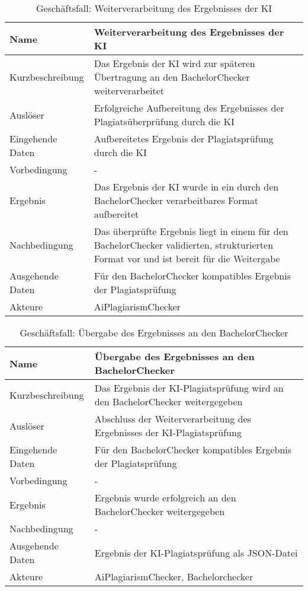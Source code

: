 \begin{table}
    \begin{tabularx}{\textwidth}{|l|X|}
        \hline
        \textbf{Name} & \textbf{Weiterverarbeitung des Ergebnisses der KI} \\
        \hline
        Kurzbeschreibung & Das Ergebnis der KI wird zur späteren Übertragung an den BachelorChecker weiterverarbeitet \\
        \hline
        Auslöser & Erfolgreiche Aufbereitung des Ergebnisses der Plagiatsüberprüfung durch die KI \\
        \hline
        Eingehende Daten & Aufbereitetes Ergebnis der Plagiatsprüfung durch die KI \\
        \hline
        Vorbedingung & - \\
        \hline
        Ergebnis & Das Ergebnis der KI wurde in ein durch den BachelorChecker verarbeitbares Format aufbereitet \\
        \hline
        Nachbedingung & Das überprüfte Ergebnis liegt in einem für den BachelorChecker validierten, strukturierten Format vor und ist bereit für die Weitergabe \\
        \hline
        Ausgehende Daten & Für den BachelorChecker kompatibles Ergebnis der Plagiatsprüfung \\
        \hline
        Akteure & AiPlagiarismChecker \\
        \hline
    \end{tabularx}
    \caption{Geschäftsfall: Weiterverarbeitung des Ergebnisses der KI}
    \label{tab:weiterverarbeitung-des-ergebnisses-der-ki}
\end{table}


\begin{table}
    \begin{tabularx}{\textwidth}{|l|X|}
        \hline
        \textbf{Name} & \textbf{Übergabe des Ergebnisses an den BachelorChecker} \\
        \hline
        Kurzbeschreibung & Das Ergebnis der KI-Plagiatsprüfung wird an den BachelorChecker weitergegeben \\
        \hline
        Auslöser & Abschluss der Weiterverarbeitung des Ergebnisses der KI-Plagiatsprüfung \\
        \hline
        Eingehende Daten & Für den BachelorChecker kompatibles Ergebnis der Plagiatsprüfung \\
        \hline
        Vorbedingung & - \\
        \hline
        Ergebnis & Ergebnis wurde erfolgreich an den BachelorChecker weitergegeben \\
        \hline
        Nachbedingung & - \\
        \hline
        Ausgehende Daten & Ergebnis der KI-Plagiatsprüfung als JSON-Datei \\
        \hline
        Akteure & AiPlagiarismChecker, Bachelorchecker \\
        \hline
    \end{tabularx}
    \caption{Geschäftsfall: Übergabe des Ergebnisses an den BachelorChecker}
    \label{tab:ubergabe-des-ergebnisses-an-den-bachelorchecker}
\end{table}
